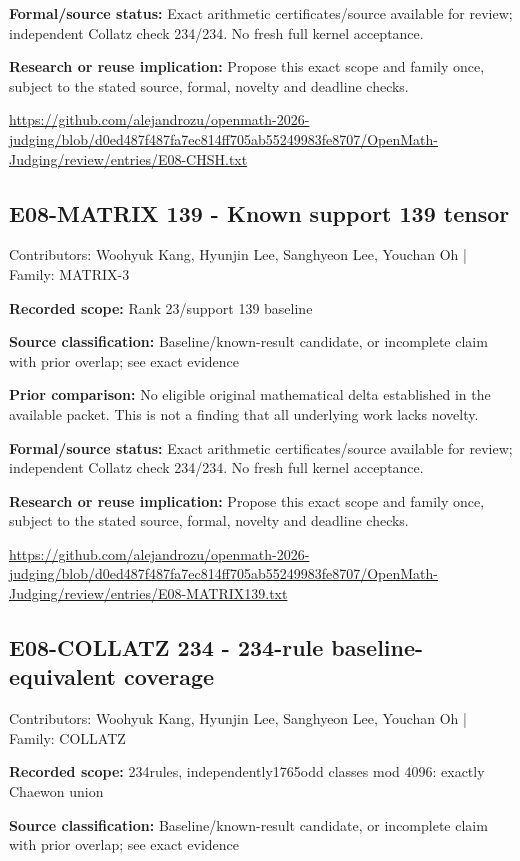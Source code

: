 \documentclass[11pt,a4paper]{article}
\begin{document}
\textbf{Formal/source status:} Exact arithmetic certificates/source available for review; independent Collatz check 234/234. No fresh full kernel acceptance.

\textbf{Research or reuse implication:} Propose this exact scope and family once, subject to the stated source, formal, novelty and deadline checks.

{\small \url{https://github.com/alejandrozu/openmath-2026-judging/blob/d0ed487f487fa7ec814ff705ab55249983fe8707/OpenMath-Judging/review/entries/E08-CHSH.txt}\par}

\begin{samepage}
\subsection{E08-MATRIX 139  -  Known support 139 tensor}
{\small Contributors: Woohyuk Kang, Hyunjin Lee, Sanghyeon Lee, Youchan Oh | Family: MATRIX-3\par}

\textbf{Recorded scope:} Rank 23/support 139 baseline

\end{samepage}
\textbf{Source classification:} Baseline/known-result candidate, or incomplete claim with prior overlap; see exact evidence

\textbf{Prior comparison:} No eligible original mathematical delta established in the available packet. This is not a finding that all underlying work lacks novelty.

\textbf{Formal/source status:} Exact arithmetic certificates/source available for review; independent Collatz check 234/234. No fresh full kernel acceptance.

\textbf{Research or reuse implication:} Propose this exact scope and family once, subject to the stated source, formal, novelty and deadline checks.

{\small \url{https://github.com/alejandrozu/openmath-2026-judging/blob/d0ed487f487fa7ec814ff705ab55249983fe8707/OpenMath-Judging/review/entries/E08-MATRIX139.txt}\par}

\begin{samepage}
\subsection{E08-COLLATZ 234  -  234-rule baseline-equivalent coverage}
{\small Contributors: Woohyuk Kang, Hyunjin Lee, Sanghyeon Lee, Youchan Oh | Family: COLLATZ\par}

\textbf{Recorded scope:} 234rules, independently1765odd classes mod 4096: exactly Chaewon union

\end{samepage}
\textbf{Source classification:} Baseline/known-result candidate, or incomplete claim with prior overlap; see exact evidence
\end{document}
